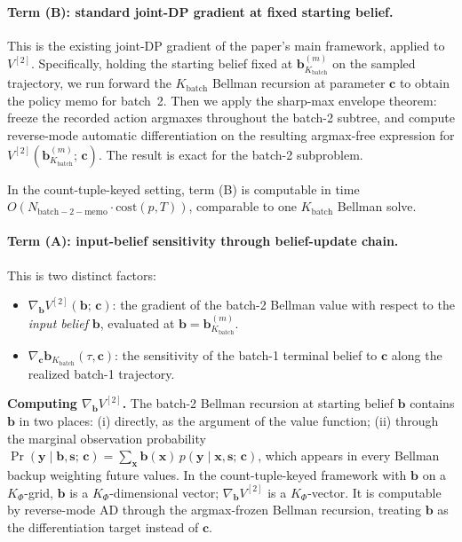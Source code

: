 \documentclass[11pt,a4paper]{article}
\newcommand{\bc}{\bm{c}}
\newcommand{\bx}{\bm{x}}
\newcommand{\by}{\bm{y}}
\newcommand{\bs}{\bm{s}}
\newcommand{\bb}{\bm{b}}
\begin{document}
\paragraph{Term (B): standard joint-DP gradient at fixed starting belief.}

This is the existing joint-DP gradient of the paper's main framework, applied to
$V^{[2]}$.  Specifically, holding the starting belief fixed at $\bb_{K_\mathrm{batch}}^{(m)}$
on the sampled trajectory, we run forward the $K_\mathrm{batch}$ Bellman recursion at
parameter $\bc$ to obtain the policy memo for batch~2.  Then we apply the sharp-max
envelope theorem: freeze the recorded action argmaxes throughout the batch-2 subtree, and
compute reverse-mode automatic differentiation on the resulting argmax-free expression for
$V^{[2]}(\bb_{K_\mathrm{batch}}^{(m)};\, \bc)$.  The result is exact for the batch-2
subproblem.

In the count-tuple-keyed setting, term (B) is computable in time $O(N_\mathrm{batch-2-memo} \cdot \mathrm{cost}(p, T))$, comparable to one $K_\mathrm{batch}$ Bellman solve.

\paragraph{Term (A): input-belief sensitivity through belief-update chain.}

This is two distinct factors:
\begin{itemize}[nosep, leftmargin=2em]
\item $\nabla_{\bb} V^{[2]}(\bb;\, \bc)$: the gradient of the batch-2 Bellman value with
      respect to the \emph{input belief} $\bb$, evaluated at $\bb = \bb_{K_\mathrm{batch}}^{(m)}$.
\item $\nabla_{\bc} \bb_{K_\mathrm{batch}}(\tau, \bc)$: the sensitivity of the batch-1
      terminal belief to $\bc$ along the realized batch-1 trajectory.
\end{itemize}

\textbf{Computing $\nabla_{\bb} V^{[2]}$.}  The batch-2 Bellman recursion at starting
belief $\bb$ contains $\bb$ in two places: (i) directly, as the argument of the value
function; (ii) through the marginal observation probability $\Pr(\by \mid \bb, \bs;\, \bc) =
\sum_{\bx} \bb(\bx)\, p(\by \mid \bx, \bs;\, \bc)$, which appears in every Bellman backup
weighting future values.  In the count-tuple-keyed framework with $\bb$ on a $K_\Phi$-grid,
$\bb$ is a $K_\Phi$-dimensional vector; $\nabla_{\bb} V^{[2]}$ is a $K_\Phi$-vector.  It is
computable by reverse-mode AD through the argmax-frozen Bellman recursion, treating $\bb$
as the differentiation target instead of $\bc$.
\end{document}
